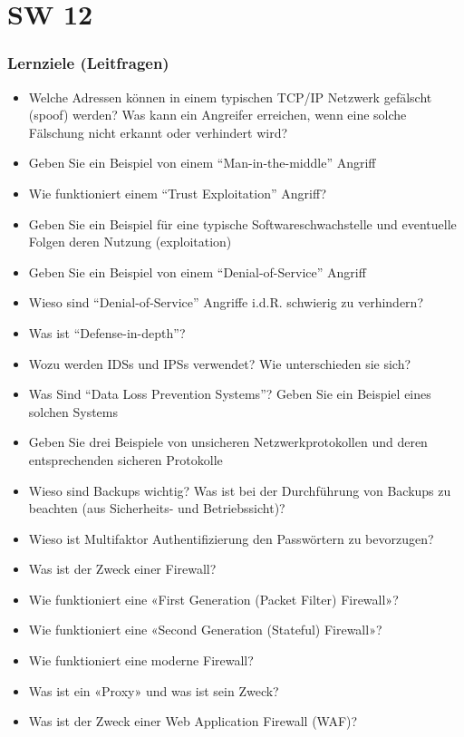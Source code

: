 \part{SW 12}
\section{Lernziele (Leitfragen)}
\begin{itemize}
    \item Welche Adressen können in einem typischen TCP/IP Netzwerk gefälscht (spoof) werden? Was kann ein Angreifer erreichen, wenn eine solche Fälschung nicht erkannt oder verhindert wird?
    \item Geben Sie ein Beispiel von einem "`Man-in-the-middle"' Angriff
    \item Wie funktioniert einem "`Trust Exploitation"' Angriff?
    \item Geben Sie ein Beispiel für eine typische Softwareschwachstelle und eventuelle Folgen deren Nutzung (exploitation)
    \item Geben Sie ein Beispiel von einem "`Denial-of-Service"' Angriff
    \item Wieso sind "`Denial-of-Service"' Angriffe i.d.R. schwierig zu verhindern?
    \item Was ist "`Defense-in-depth"'?
    \item Wozu werden IDSs und IPSs verwendet? Wie unterschieden sie sich?
    \item Was Sind "`Data Loss Prevention Systems"'? Geben Sie ein Beispiel eines solchen Systems
    \item Geben Sie drei Beispiele von unsicheren Netzwerkprotokollen und deren entsprechenden sicheren Protokolle
    \item Wieso sind Backups wichtig? Was ist bei der Durchführung von Backups zu beachten (aus Sicherheits- und Betriebssicht)?
    \item Wieso ist Multifaktor Authentifizierung den Passwörtern zu bevorzugen?
    \item Was ist der Zweck einer Firewall?
    \item Wie funktioniert eine «First Generation (Packet Filter) Firewall»?
    \item Wie funktioniert eine «Second Generation (Stateful) Firewall»?
    \item Wie funktioniert eine moderne Firewall?
    \item Was ist ein «Proxy» und was ist sein Zweck?
    \item Was ist der Zweck einer Web Application Firewall (WAF)?

\end{itemize}
